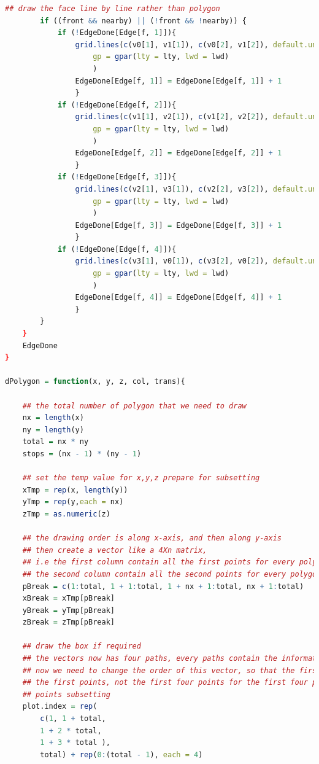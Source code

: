 \documentclass{report}
\begin{document}
\begin{lstlisting}[language = R]
        ## draw the face line by line rather than polygon
        if ((front && nearby) || (!front && !nearby)) {
            if (!EdgeDone[Edge[f, 1]]){
                grid.lines(c(v0[1], v1[1]), c(v0[2], v1[2]), default.units = 'native',
                    gp = gpar(lty = lty, lwd = lwd) 
                    )
                EdgeDone[Edge[f, 1]] = EdgeDone[Edge[f, 1]] + 1
                }
            if (!EdgeDone[Edge[f, 2]]){
                grid.lines(c(v1[1], v2[1]), c(v1[2], v2[2]), default.units = 'native',
                    gp = gpar(lty = lty, lwd = lwd) 
                    )
                EdgeDone[Edge[f, 2]] = EdgeDone[Edge[f, 2]] + 1
                }
            if (!EdgeDone[Edge[f, 3]]){
                grid.lines(c(v2[1], v3[1]), c(v2[2], v3[2]), default.units = 'native',
                    gp = gpar(lty = lty, lwd = lwd) 
                    )
                EdgeDone[Edge[f, 3]] = EdgeDone[Edge[f, 3]] + 1
                }
            if (!EdgeDone[Edge[f, 4]]){
                grid.lines(c(v3[1], v0[1]), c(v3[2], v0[2]), default.units = 'native',
                    gp = gpar(lty = lty, lwd = lwd)
                    )
                EdgeDone[Edge[f, 4]] = EdgeDone[Edge[f, 4]] + 1
                }
        }
    }
    EdgeDone
}

dPolygon = function(x, y, z, col, trans){

    ## the total number of polygon that we need to draw	
	nx = length(x)
	ny = length(y)
    total = nx * ny
	stops = (nx - 1) * (ny - 1)

    ## set the temp value for x,y,z prepare for subsetting
    xTmp = rep(x, length(y))
    yTmp = rep(y,each = nx)
    zTmp = as.numeric(z)
    
    ## the drawing order is along x-axis, and then along y-axis
    ## then create a vector like a 4Xn matrix, 
    ## i.e the first column contain all the first points for every polygons
    ## the second column contain all the second points for every polygons and so on 
    pBreak = c(1:total, 1 + 1:total, 1 + nx + 1:total, nx + 1:total)
    xBreak = xTmp[pBreak]
    yBreak = yTmp[pBreak]
    zBreak = zTmp[pBreak]
    
    ## draw the box if required
    ## the vectors now has four paths, every paths contain the information of every points of every polygon
    ## now we need to change the order of this vector, so that the first four index should be the order for drawing 
    ## the first points, not the first four points for the first four polygon
    ## points subsetting 
    plot.index = rep(
        c(1, 1 + total, 
        1 + 2 * total, 
        1 + 3 * total ),
        total) + rep(0:(total - 1), each = 4)


\end{lstlisting}
\end{document}
